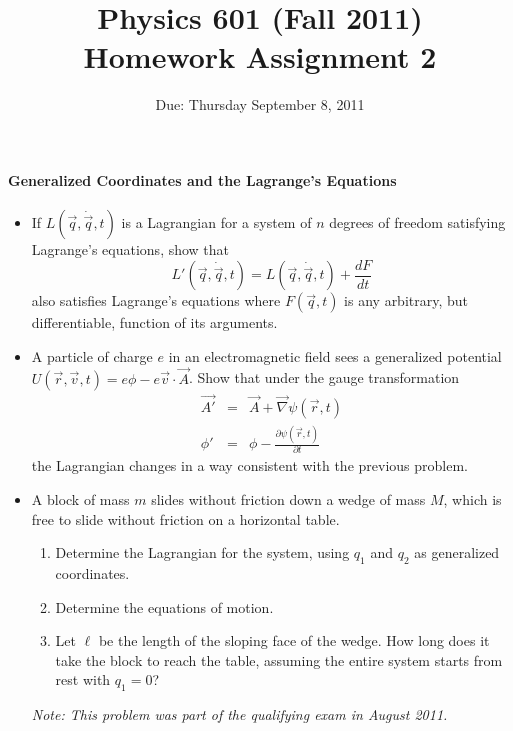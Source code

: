 \documentclass[letterpaper,11pt]{article}
\title{Physics 601 (Fall 2011) \\ Homework Assignment 2}
\date{Due: Thursday September 8, 2011}
\begin{document}
\maketitle

\paragraph*{Generalized Coordinates and the Lagrange's Equations}
\begin{itemize}
 \item If $L(\vec{q},\dot{\vec{q}},t)$ is a Lagrangian for a system of $n$ degrees of freedom satisfying Lagrange's equations, show that
  \begin{equation*}
   L'(\vec{q},\dot{\vec{q}},t) = L(\vec{q},\dot{\vec{q}},t) + \frac{dF}{dt}
  \end{equation*}
 also satisfies Lagrange's equations where $F(\vec{q},t)$ is any arbitrary, but differentiable, function of its arguments.
 \item A particle of charge $e$ in an electromagnetic field sees a generalized potential $U(\vec{r},\vec{v},t) = e \phi - e \vec{v} \cdot \vec{A}$.  Show that under the gauge transformation
  \begin{eqnarray*}
   \vec{A'} & = & \vec{A} + \vec{\nabla} \psi(\vec{r},t) \\
   \phi'    & = & \phi - \frac{\partial\psi(\vec{r},t)}{\partial t}
  \end{eqnarray*}
 the Lagrangian changes in a way consistent with the previous problem.
 \item A block of mass $m$ slides without friction down a wedge of mass $M$, which is free to slide without friction on a horizontal table.
 \begin{enumerate}
  \item Determine the Lagrangian for the system, using $q_1$ and $q_2$ as generalized coordinates.
  \item Determine the equations of motion.
  \item Let $\ell$ be the length of the sloping face of the wedge.  How long does it take the block to reach the table, assuming the entire system starts from rest with $q_1 = 0$?
 \end{enumerate}
 \textit{Note: This problem was part of the qualifying exam in August 2011.}
 \begin{center}
 \end{center}
\end{itemize}
\end{document}
